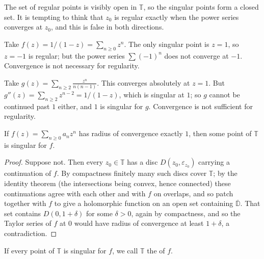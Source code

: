 \documentclass[a4paper]{scrartcl}
\newcommand{\disc}{\mathbb{D}}
\begin{document}
The set of regular points is visibly open in $\mathbb{T}$, so the singular points form a
closed set. It is tempting to think that $z_0$ is regular exactly when the power series
converges at $z_0$, and this is false in both directions.

\begin{example}
	Take $f(z) = 1/(1-z) = \sum_{n \geq 0} z^n$. The only singular point is $z = 1$, so
	$z = -1$ is regular; but the power series $\sum (-1)^n$ does not converge at $-1$.
	Convergence is not necessary for regularity.
\end{example}

\begin{example}
	Take $g(z) = \sum_{n \geq 2} \frac{z^n}{n(n-1)}$. This converges absolutely at
	$z = 1$. But $g''(z) = \sum_{n\geq 2} z^{n-2} = 1/(1-z)$, which is singular at $1$; so
	$g$ cannot be continued past $1$ either, and $1$ is singular for $g$. Convergence is
	not sufficient for regularity.
\end{example}

\begin{proposition}
	If $f(z) = \sum_{n \geq 0}a_n z^n$ has radius of convergence exactly $1$, then some
	point of $\mathbb{T}$ is singular for $f$.
\end{proposition}

\begin{proof}
	Suppose not. Then every $z_0 \in \mathbb{T}$ has a disc $D(z_0, \varepsilon_{z_0})$
	carrying a continuation of $f$. By compactness finitely many such discs cover
	$\mathbb{T}$; by the identity theorem (the intersections being convex, hence connected)
	these continuations agree with each other and with $f$ on overlaps, and so patch
	together with $f$ to give a holomorphic function on an open set containing
	$\overline{\disc}$. That set contains $D(0, 1 + \delta)$ for some $\delta > 0$, again
	by compactness, and so the Taylor series of $f$ at $0$ would have radius of convergence
	at least $1 + \delta$, a contradiction.
\end{proof}

\begin{definition}
	If every point of $\mathbb{T}$ is singular for $f$, we call $\mathbb{T}$ the
	 of $f$.
\end{definition}
\end{document}
